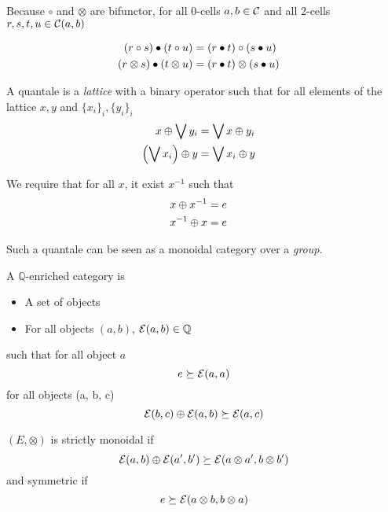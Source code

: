 \documentclass[a4paper]{article}
\begin{document}
\begin{remark}
Because $\circ$ and $\otimes$ are bifunctor, for all 0-cells $a, b \in {\cal C}$ and all 2-cells $r, s, t, u \in {\cal C}(a, b)$

\begin{align}
(r \circ s) \bullet (t \circ u) &= (r \bullet t) \circ (s \bullet u) \cr
(r \otimes s) \bullet (t \otimes u) &= (r \bullet t) \otimes (s \bullet u)
\end{align}
\end{remark}

\begin{definition}
A quantale is a \emph{lattice} with a binary operator such that for all elements of the lattice $x, y$ and $\{x_i\}_i, \{y_i\}_i$
\begin{align}
x \oplus \bigvee y_i &= \bigvee x \oplus y_i \cr
\left(\bigvee x_i\right) \oplus y &= \bigvee x_i \oplus y
\end{align}

We require that for all $x$, it exist $x^{-1}$ such that
\begin{align}
x \oplus x^{-1} &= e \cr
x^{-1} \oplus x &= e
\end{align}

Such a quantale can be seen as a monoidal category over a \emph{group}.
\end{definition}

\begin{definition}
A $\mathbb{Q}$-enriched category \catE is

\begin{itemize}
\item A set of objects
\item For all objects $(a, b)$, ${\cal E}(a, b) \in \mathbb{Q}$
\end{itemize}

such that for all object $a$
\[
e \succeq {\cal E}(a, a)
\]
for all objects (a, b, c)
\[
{\cal E}(b, c) \oplus {\cal E}(a, b) \succeq {\cal E}(a, c)
\]
\end{definition}

\begin{definition}
$(E, \otimes)$ is strictly monoidal if
\[
{\cal E}(a, b) \oplus {\cal E}(a', b') \succeq {\cal E}(a \otimes a', b \otimes b')
\]
and symmetric if
\[
e \succeq {\cal E}(a \otimes b, b \otimes a)
\]
\end{definition}
\end{document}
